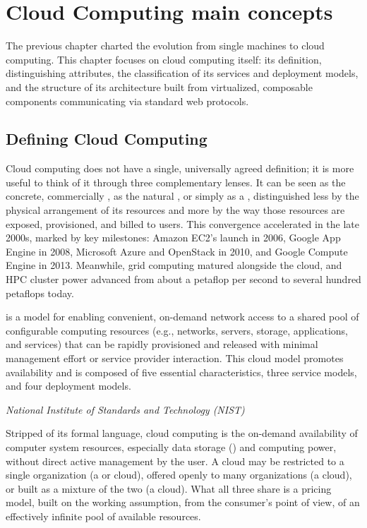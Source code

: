 \chapter{Cloud Computing main concepts} \label{ch:cloud_concept}

The previous chapter charted the evolution from single machines to cloud computing. This chapter focuses on cloud computing itself: its definition, distinguishing attributes, the classification of its services and deployment models, and the structure of its architecture built from virtualized, composable components communicating via standard web protocols.

\section{Defining Cloud Computing} \label{sec:defining_cloud}

Cloud computing does not have a single, universally agreed definition; it is more useful to think of it through three complementary lenses. It can be seen as the concrete, commercially , as the natural , or simply as a , distinguished less by the physical arrangement of its resources and more by the way those resources are exposed, provisioned, and billed to users. This convergence accelerated in the late 2000s, marked by key milestones: Amazon EC2's launch in 2006, Google App Engine in 2008, Microsoft Azure and OpenStack in 2010, and Google Compute Engine in 2013. Meanwhile, grid computing matured alongside the cloud, and HPC cluster power advanced from about a petaflop per second to several hundred petaflops today.

\begin{definitionblock}
     is a model for enabling convenient, on-demand network access to a shared pool of configurable computing resources (e.g., networks, servers, storage, applications, and services) that can be rapidly provisioned and released with minimal management effort or service provider interaction. This cloud model promotes availability and is composed of five essential characteristics, three service models, and four deployment models.

    \hfill \textit{National Institute of Standards and Technology (NIST)}
\end{definitionblock}

Stripped of its formal language, cloud computing is the on-demand availability of computer system resources, especially data storage () and computing power, without direct active management by the user. A cloud may be restricted to a single organization (a  or  cloud), offered openly to many organizations (a  cloud), or built as a mixture of the two (a  cloud). What all three share is a  pricing model, built on the working assumption, from the consumer's point of view, of an effectively infinite pool of available resources.

